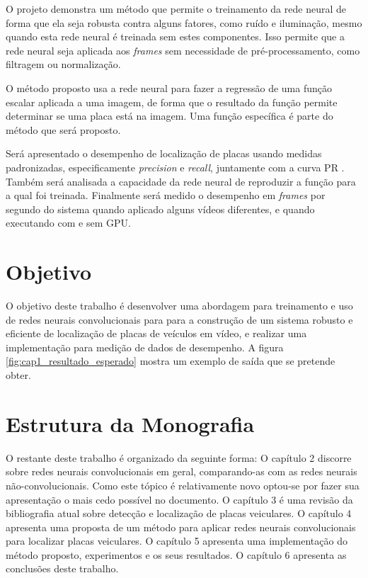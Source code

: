 O projeto demonstra um método que permite o treinamento da rede neural de forma
que ela seja robusta contra alguns fatores, como ruído e iluminação, mesmo
quando esta rede neural é treinada sem estes componentes. Isso permite que a
rede neural seja aplicada aos \emph{frames} sem necessidade de
pré-processamento, como filtragem ou normalização.

O método proposto usa a rede neural para fazer a regressão de uma função
escalar aplicada a uma imagem, de forma que o resultado da função permite
determinar se uma placa está na imagem. Uma função específica é parte do método
que será proposto.

Será apresentado o desempenho de localização de placas usando medidas
padronizadas, especificamente \emph{precision} e \emph{recall}, juntamente com
a curva PR \cite{powers2011evaluation}. Também será analisada a capacidade da
rede neural de reproduzir a
função para a qual foi treinada. Finalmente será medido o desempenho em
\emph{frames} por segundo do sistema quando aplicado alguns vídeos diferentes,
e quando executando com e sem GPU.

\section{Objetivo}
O objetivo deste trabalho é desenvolver uma abordagem para
treinamento e uso de redes neurais convolucionais para para a
construção de um sistema robusto e eficiente de localização de
placas de veículos em vídeo, e realizar uma implementação para
medição de dados de desempenho. A figura \ref{fig:cap1_resultado_esperado}
mostra um exemplo de saída que se pretende obter.

\section{Estrutura da Monografia}
O restante deste trabalho é organizado da seguinte forma: O
capítulo 2 discorre sobre redes neurais convolucionais em geral,
comparando-as com as redes neurais não-convolucionais. Como este
tópico é relativamente novo optou-se por fazer sua apresentação
o mais cedo possível no documento. O capítulo 3 é uma revisão da
bibliografia atual sobre detecção e localização de placas veiculares. O
capítulo 4 apresenta uma proposta de um método para aplicar redes neurais
convolucionais para localizar placas veiculares. O capítulo 5 apresenta uma
implementação do método proposto, experimentos e os seus resultados. O
capítulo 6 apresenta as conclusões deste trabalho.

